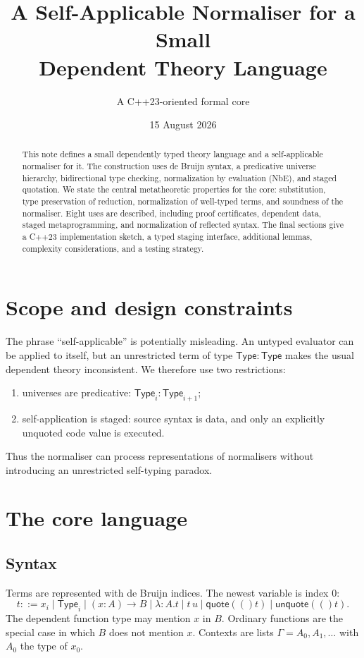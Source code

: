 \documentclass[11pt,a4paper]{article}
\title{A Self-Applicable Normaliser for a Small\\Dependent Theory Language}
\author{A C++23-oriented formal core}
\date{15 August 2026}
\newcommand{\Ty}{\mathsf{Type}}
\renewcommand{\quote}[1]{\mathsf{quote}(#1)}
\newcommand{\unquote}[1]{\mathsf{unquote}(#1)}
\begin{document}
\maketitle
\begin{abstract}
This note defines a small dependently typed theory language and a self-applicable normaliser for it. The construction uses de Bruijn syntax, a predicative universe hierarchy, bidirectional type checking, normalization by evaluation (NbE), and staged quotation. We state the central metatheoretic properties for the core: substitution, type preservation of reduction, normalization of well-typed terms, and soundness of the normaliser. Eight uses are described, including proof certificates, dependent data, staged metaprogramming, and normalization of reflected syntax. The final sections give a C++23 implementation sketch, a typed staging interface, additional lemmas, complexity considerations, and a testing strategy.
\end{abstract}
\tableofcontents

\section{Scope and design constraints}
The phrase ``self-applicable'' is potentially misleading. An untyped evaluator can be applied to itself, but an unrestricted term of type $\Ty: \Ty$ makes the usual dependent theory inconsistent. We therefore use two restrictions:
\begin{enumerate}
\item universes are predicative: $\Ty_i:\Ty_{i+1}$;
\item self-application is staged: source syntax is data, and only an explicitly unquoted code value is executed.
\end{enumerate}
Thus the normaliser can process representations of normalisers without introducing an unrestricted self-typing paradox.

\section{The core language}
\subsection{Syntax}
Terms are represented with de Bruijn indices. The newest variable is index $0$:
\[
t ::= x_i \mid \Ty_i \mid (x:A)\to B \mid \lambda:A.t \mid t\,u \mid \quote(t) \mid \unquote(t).
\]
The dependent function type may mention $x$ in $B$. Ordinary functions are the special case in which $B$ does not mention $x$. Contexts are lists $\Gamma=A_0,A_1,\ldots$ with $A_0$ the type of $x_0$.
\end{document}
